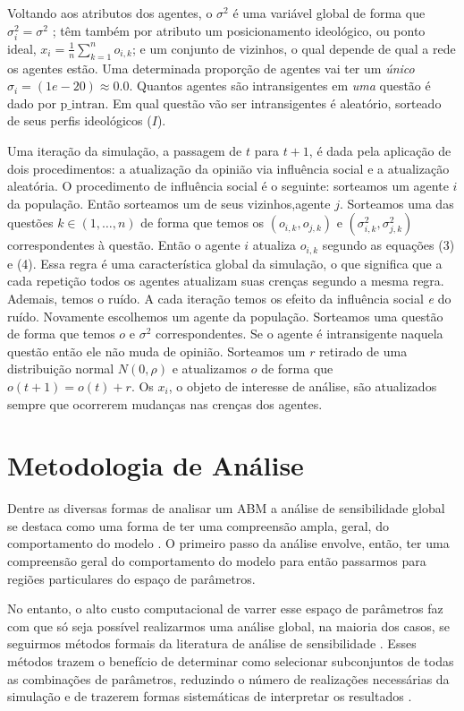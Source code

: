 Voltando aos atributos dos agentes, o \(\sigma^2\) é uma variável global de forma que
\(\sigma_i^2 = \sigma^2\) ; têm também por atributo um posicionamento ideológico, ou ponto
ideal, \(x_i = \frac{1}{n} \sum_{k = 1}^n o_{i,k} \); e um conjunto de vizinhos, o
qual depende de qual a rede os agentes estão. Uma determinada proporção de
agentes vai ter um \textit{único} \(\sigma_i = (1e-20 ) \approx 0.0 \). Quantos agentes são
intransigentes em \textit{uma} questão é dado por \(\text{p\_intran}\). Em qual
questão vão ser intransigentes é aleatório, sorteado de seus perfis ideológicos (\(I\)).

Uma iteração da simulação, a passagem de \(t\) para \(t+1\), é dada pela
aplicação de dois procedimentos: a atualização da opinião via influência social
e a atualização aleatória. O procedimento de influência social é o seguinte:
sorteamos um agente \(i\) da população. Então sorteamos um de seus
vizinhos,agente \(j\). Sorteamos uma das questões \(k \in (1,\ldots,n)\) de forma que
temos os \((o_{i,k},o_{j,k})\) e \((\sigma_{i,k}^2,\sigma_{j,k}^2)\) correspondentes à
questão. Então o agente \(i\) atualiza \(o_{i,k}\) segundo as equações (3) e
(4). Essa regra é uma característica global da simulação, o que significa que a
cada repetição todos os agentes atualizam suas crenças segundo a mesma regra.
Ademais, temos o ruído. A cada iteração temos os efeito da influência social
\textit{e} do ruído. Novamente escolhemos um agente da população. Sorteamos uma
questão de forma que temos \(o\) e \(\sigma^2\) correspondentes. Se o agente é
intransigente naquela questão então ele não muda de opinião. Sorteamos um \(r\)
retirado de uma distribuição normal \(N(0,\rho)\) e atualizamos \(o\) de forma que
\(o(t+1) = o(t) + r\). Os \(x_i\), o objeto de interesse de análise, são
atualizados sempre que ocorrerem mudanças nas crenças dos agentes.

\section{Metodologia de Análise}

Dentre as diversas formas de analisar um ABM a análise de sensibilidade global
se destaca como uma forma de ter uma compreensão ampla, geral, do comportamento
do modelo \cite{north2007managing}. O primeiro passo da análise envolve, então,
 ter uma compreensão geral do comportamento do modelo para então passarmos
para regiões particulares do espaço de parâmetros.

No entanto, o alto custo computacional de varrer esse espaço de parâmetros faz com
que só seja possível realizarmos uma análise global, na maioria dos casos, se
seguirmos métodos formais da literatura de análise de sensibilidade
\cite{railsback2012agent}. Esses métodos trazem o benefício de determinar como
selecionar subconjuntos de todas as combinações de parâmetros, reduzindo o
número de realizações necessárias da simulação e de trazerem formas sistemáticas
de interpretar os resultados \cite{railsback2012agent}.


